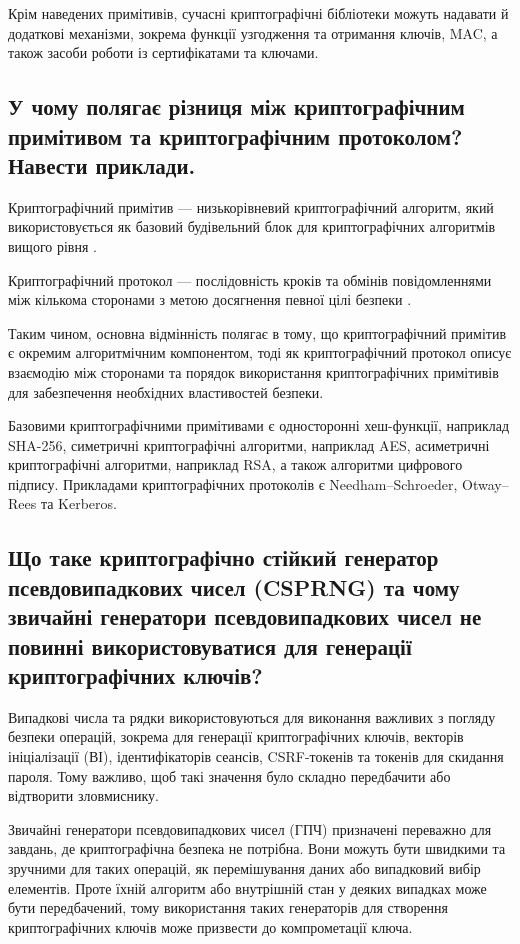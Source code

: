 Крім наведених примітивів, сучасні криптографічні бібліотеки можуть надавати й додаткові механізми, зокрема функції узгодження та отримання ключів, MAC, 
а також засоби роботи із сертифікатами та ключами.


\subsection{У чому полягає різниця між криптографічним примітивом та криптографічним протоколом? Навести приклади.}

Криптографічний примітив --- низькорівневий криптографічний алгоритм, який використовується як базовий будівельний
блок для криптографічних алгоритмів вищого рівня \cite{Cryptographic Primitive}.

Криптографічний протокол --- послідовність кроків та обмінів повідомленнями між кількома сторонами 
з метою досягнення певної цілі безпеки \cite{Crypto Protocols}.

Таким чином, основна відмінність полягає в тому, що криптографічний примітив є окремим алгоритмічним компонентом, тоді як криптографічний протокол описує 
взаємодію між сторонами та порядок використання криптографічних примітивів для забезпечення необхідних властивостей безпеки.

Базовими криптографічними примітивами є односторонні хеш-функції, наприклад SHA-256, симетричні криптографічні алгоритми, наприклад AES, 
асиметричні криптографічні алгоритми, наприклад RSA, а також алгоритми цифрового підпису. \cite{Crypto Primitive Wiki}
Прикладами криптографічних протоколів є Needham–Schroeder, Otway–Rees та Kerberos. \cite{Crypto Protocols}

\subsection{Що таке криптографічно стійкий генератор псевдовипадкових чисел (CSPRNG) та чому звичайні генератори псевдовипадкових чисел не повинні використовуватися для генерації криптографічних ключів?}

Випадкові числа та рядки використовуються для виконання важливих з погляду безпеки операцій, 
зокрема для генерації криптографічних ключів, векторів ініціалізації (ВІ), ідентифікаторів сеансів, 
CSRF-токенів та токенів для скидання пароля. Тому важливо, щоб такі значення було складно передбачити або відтворити зловмиснику.

Звичайні генератори псевдовипадкових чисел (ГПЧ) призначені переважно для завдань, де криптографічна безпека не потрібна. 
Вони можуть бути швидкими та зручними для таких операцій, як перемішування даних або випадковий вибір елементів. 
Проте їхній алгоритм або внутрішній стан у деяких випадках може бути передбачений, тому використання таких генераторів для створення 
криптографічних ключів може призвести до компрометації ключа.

